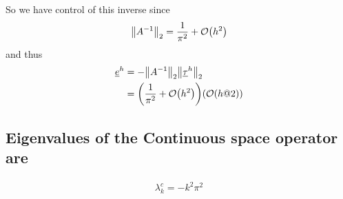 \documentclass{article}
\begin{document}
                {\color{red}So we have control of this inverse since
                                \begin{align}
                                    \norm{A^{-1}}_2 = \frac{1}{\pi^2} + \order{h^2}
                                \end{align}
                                and thus
                                \begin{align}
                                    \underline{e}^h &= -\norm{A^{-1}}_2\norm{\underline{\tau}^h}_2 \\
                                    &= \qty(\frac{1}{\pi^2} + \order{h^2})(\order{h@2})
                                \end{align}
                        \subsection{Eigenvalues of the Continuous space operator are}
                            \begin{align}
                                \lambda_k^c = -k^2\pi^2
                            \end{align}}
\end{document}
